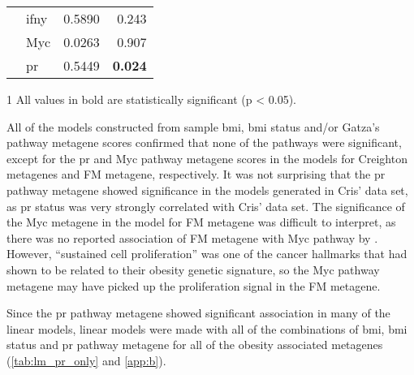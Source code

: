 \begin{table}[htpb]
\begin{threeparttable}
\begin{tabular}{llrr}
                                                                       & \gls{ifny} & 0.5890  & 0.243\\
                                                                       & Myc        & 0.0263  & 0.907\\
                                                                       & \gls{pr}   & 0.5449  & \textbf{0.024}\\
			\hline
			\hline
		\end{tabular}
		\begin{tablenotes}
			\item [1] All values in bold are statistically significant (p \textless{} 0.05).
		\end{tablenotes}
	\end{threeparttable}
\end{table}

All of the models constructed from sample \gls{bmi}, \gls{bmi} status and/or Gatza's pathway metagene scores confirmed that none of the pathways were significant, except for the \gls{pr} and Myc pathway metagene scores in the models for Creighton metagenes and FM metagene, respectively.
It was not surprising that the \gls{pr} pathway metagene showed significance in the models generated in Cris' data set, as \gls{pr} status was very strongly correlated with Cris' data set.
The significance of the Myc metagene in the model for FM metagene was difficult to interpret, as there was no reported association of FM metagene with Myc pathway by \citet{Fuentes-Mattei2014}.
However, ``sustained cell proliferation'' was one of the cancer hallmarks that \citet{Fuentes-Mattei2014} had shown to be related to their obesity genetic signature, so the Myc pathway metagene may have picked up the proliferation signal in the FM metagene.

Since the \gls{pr} pathway metagene showed significant association in many of the linear models, linear models were made with all of the combinations of \gls{bmi}, \gls{bmi} status and \gls{pr} pathway metagene for all of the obesity associated metagenes (\cref{tab:lm_pr_only} and \cref{app:b}).


